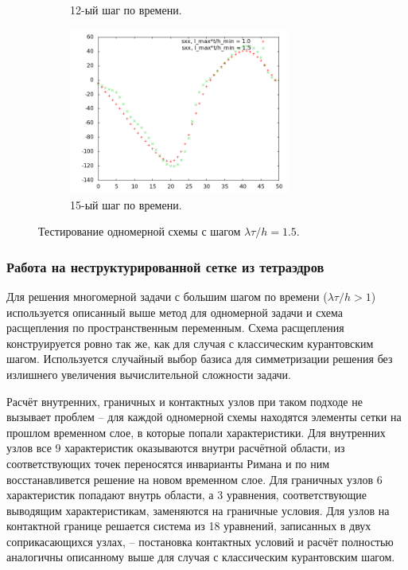 \begin{figure}[htp]
\begin{subfigure}[b]{0.5\textwidth}
\caption{12-ый шаг по времени.}
\end{subfigure}
\begin{subfigure}[b]{0.5\textwidth}
\centering
\includegraphics[width=0.8\textwidth]{png/big-sigma-test-results-1d/snap-15.png}
\caption{15-ый шаг по времени.}
\end{subfigure}
\caption{Тестирование одномерной схемы с шагом $\lambda \tau / h = 1.5$.}
\label{pic:scheme_1d_test}
\end{figure}


\subsubsection{Работа на неструктурированной сетке из тетраэдров}

Для решения многомерной задачи с большим шагом по времени ($\lambda \tau / h > 1$) используется описанный выше метод для одномерной задачи и схема расщепления по пространственным переменным. Схема расщепления конструируется ровно так же, как для случая с классическим курантовским шагом. Используется случайный выбор базиса для симметризации решения без излишнего увеличения вычислительной сложности задачи.

Расчёт внутренних, граничных и контактных узлов при таком подходе не вызывает проблем -- для каждой одномерной схемы находятся элементы сетки на прошлом временном слое, в которые попали характеристики. Для внутренних узлов все 9 характеристик оказываются внутри расчётной области, из соответствующих точек переносятся инварианты Римана и по ним восстанавливется решение на новом временном слое. Для граничных узлов 6 характеристик попадают внутрь области, а 3 уравнения, соответствующие выводящим характеристикам, заменяются на граничные условия. Для узлов на контактной границе решается система из 18 уравнений, записанных в двух соприкасающихся узлах, -- постановка контактных условий и расчёт полностью аналогичны описанному выше для случая с классическим курантовским шагом.

